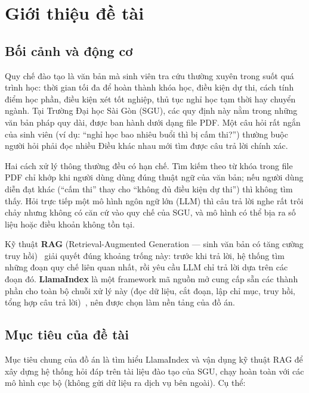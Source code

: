 \chapter{Giới thiệu đề tài}
\label{ch:gioi-thieu}


\section{Bối cảnh và động cơ}

Quy chế đào tạo là văn bản mà sinh viên tra cứu thường xuyên trong suốt quá trình học: thời gian tối đa để hoàn thành khóa học, điều kiện dự thi, cách tính điểm học phần, điều kiện xét tốt nghiệp, thủ tục nghỉ học tạm thời hay chuyển ngành. Tại Trường Đại học Sài Gòn (SGU), các quy định này nằm trong những văn bản pháp quy dài, được ban hành dưới dạng file PDF. Một câu hỏi rất ngắn của sinh viên (ví dụ: ``nghỉ học bao nhiêu buổi thì bị cấm thi?'') thường buộc người hỏi phải đọc nhiều Điều khác nhau mới tìm được câu trả lời chính xác.

Hai cách xử lý thông thường đều có hạn chế. Tìm kiếm theo từ khóa trong file PDF chỉ khớp khi người dùng dùng đúng thuật ngữ của văn bản; nếu người dùng diễn đạt khác (``cấm thi'' thay cho ``không đủ điều kiện dự thi'') thì không tìm thấy. Hỏi trực tiếp một mô hình ngôn ngữ lớn (LLM) thì câu trả lời nghe rất trôi chảy nhưng không có căn cứ vào quy chế của SGU, và mô hình có thể bịa ra số liệu hoặc điều khoản không tồn tại.

Kỹ thuật \textbf{RAG} (Retrieval-Augmented Generation --- sinh văn bản có tăng cường truy hồi)~\cite{lewis2020rag,gao2023ragsurvey} giải quyết đúng khoảng trống này: trước khi trả lời, hệ thống tìm những đoạn quy chế liên quan nhất, rồi yêu cầu LLM chỉ trả lời dựa trên các đoạn đó. \textbf{LlamaIndex} là một framework mã nguồn mở cung cấp sẵn các thành phần cho toàn bộ chuỗi xử lý này (đọc dữ liệu, cắt đoạn, lập chỉ mục, truy hồi, tổng hợp câu trả lời)~\cite{llamaindex2025docs,llamaindexrepo}, nên được chọn làm nền tảng của đồ án.

\section{Mục tiêu của đề tài}

Mục tiêu chung của đồ án là tìm hiểu LlamaIndex và vận dụng kỹ thuật RAG để xây dựng hệ thống hỏi đáp trên tài liệu đào tạo của SGU, chạy hoàn toàn với các mô hình cục bộ (không gửi dữ liệu ra dịch vụ bên ngoài). Cụ thể:

